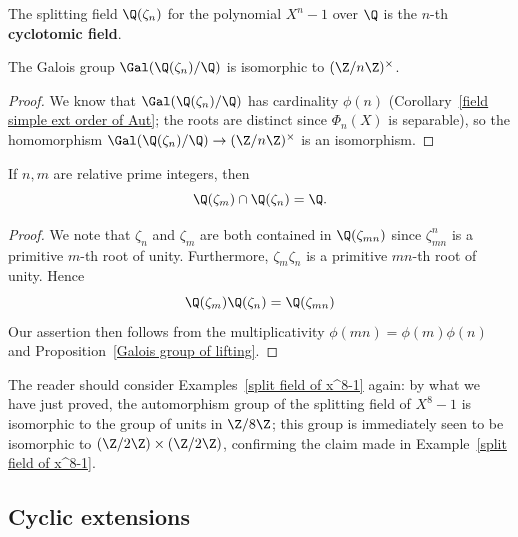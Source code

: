 \begin{definition}
The splitting field $\Q(\zeta_n)$ for the polynomial $X^n-1$ over $\Q$ is the $n$-th \textbf{cyclotomic field}.
\end{definition}
\begin{proposition}\label{Galois group of cyclotomic field}
The Galois group $\Gal(\Q(\zeta_n)/\Q)$ is isomorphic to $(\Z/n\Z)^\times$.
\end{proposition}
\begin{proof}
We know that $\Gal(\Q(\zeta_n)/\Q)$ has cardinality $\phi(n)$ (Corollary~\ref{field simple ext order of Aut}; the roots
are distinct since $\Phi_n(X)$ is separable), so the homomorphism $\Gal(\Q(\zeta_n)/\Q)\to(\Z/n\Z)^\times$ is an isomorphism.
\end{proof}
\begin{corollary}
If $n,m$ are relative prime integers, then
\[\Q(\zeta_m)\cap\Q(\zeta_n)=\Q.\]
\end{corollary}
\begin{proof}
We note that $\zeta_n$ and $\zeta_m$ are both contained in $\Q(\zeta_{mn})$ since $\zeta_{mn}^n$ is a primitive $m$-th root of unity. Furthermore, $\zeta_{m}\zeta_n$ is a primitive $mn$-th root of unity. Hence
\[\Q(\zeta_m)\Q(\zeta_n)=\Q(\zeta_{mn})\]
Our assertion then follows from the multiplicativity $\phi(mn)=\phi(m)\phi(n)$ and Proposition~\ref{Galois group of lifting}.
\end{proof}
\begin{example}
The reader should consider Examples~\ref{split field of x^8-1} again: by what we have just proved, the automorphism group of the splitting field of $X^8-1$ is isomorphic to the group of units in $\Z/8\Z$; this group is immediately seen to be isomorphic to $(\Z/2\Z)\times(\Z/2\Z)$, confirming the claim made in Example~\ref{split field of x^8-1}.
\end{example}
\subsection{Cyclic extensions}
